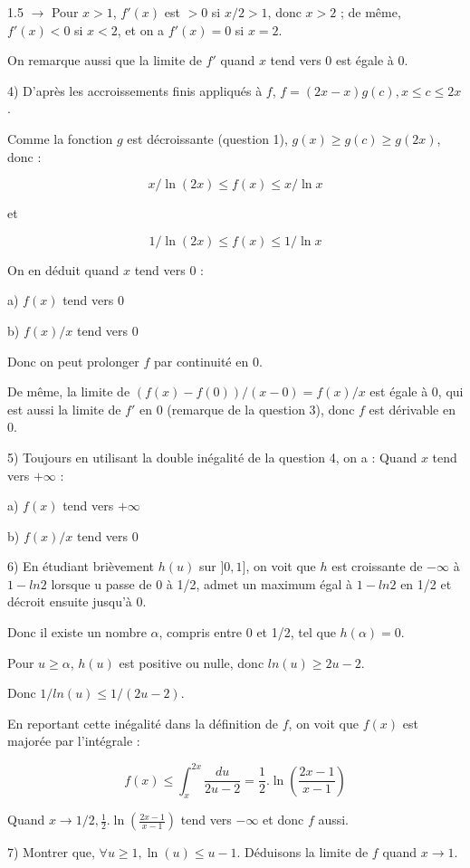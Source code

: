 \documentclass[12pt]{article}
\begin{document}
\begin{spacing}{1.5}
$\longrightarrow$ Pour $x > 1$, $f'(x)$ est $> 0$ si $x /2 > 1$, donc $x > 2$ ; de même, $f'(x) < 0$ si $x < 2$, et on a 
$f'(x) = 0$ si $x = 2$. 

On remarque aussi que la limite de $f'$ quand $x$ tend vers 0 est égale à 0. 
 
4) D'après les accroissements finis appliqués à $f$, $f = (2x-x)g(c), x \leqslant c \leqslant 2x$. 

Comme la fonction $g$ est décroissante (question 1), $g(x)\geqslant g(c)\geqslant g(2x)$, donc : 

\[x/\ln(2x)\leqslant f(x)\leqslant x/\ln x\]

et 

\[1/\ln(2x)\leqslant f(x)\leqslant 1/\ln x\]
 
On en déduit quand $x$ tend vers 0 : 

a) $f(x)$ tend vers 0 

b) $f(x) / x$ tend vers 0 

Donc on peut prolonger $f$ par continuité en 0. 

De même, la limite de $(f(x)-f (0))/(x-0) =f(x) /x$ est égale à 0, qui est aussi la limite 
de $f'$ en 0 (remarque de la question 3), donc $f$ est dérivable en 0. 

5) Toujours en utilisant la double inégalité de la question 4, on a : 
Quand $x$ tend vers $+\infty$ : 

a) $f(x)$ tend vers $+\infty$ 

b) $f(x) / x$ tend vers 0 

6) En étudiant brièvement $h(u)$ sur $]0, 1]$, on voit que $h$ est croissante de $-\infty$ à $1-ln2$ lorsque u passe de 0 à 1/2, admet un maximum égal à $1-ln2$ en 1/2 et décroit ensuite jusqu'à 0. 

Donc il existe un nombre $\alpha$, compris entre 0 et 1/2, tel que $h(\alpha) = 0$. 

Pour $u\geqslant\alpha$, $h(u)$ est positive ou nulle, donc $ln(u)\geqslant 2u-2$. 

Donc $1/ln(u)\leqslant 1/(2u-2)$. 

En reportant cette inégalité dans la définition de $f$, on voit que $f(x)$ est majorée par l'intégrale : 

\[
f(x)\leqslant \int_{x}^{2x}\frac{du}{2u-2}=\frac{1}{2}.\ln(\frac{2x-1}{x-1})\]
 
 Quand $x\rightarrow 1/2,\frac{1}{2}.\ln\left(\frac{2x-1}{x-1}\right)$ tend vers  $-\infty$ et donc $f$ aussi. 

7) Montrer que, $\forall u\geqslant 1, \ln(u)\leqslant u-1$. 
Déduisons la limite de $f$ quand  $x\rightarrow 1$. 


\end{spacing}
\end{document}
